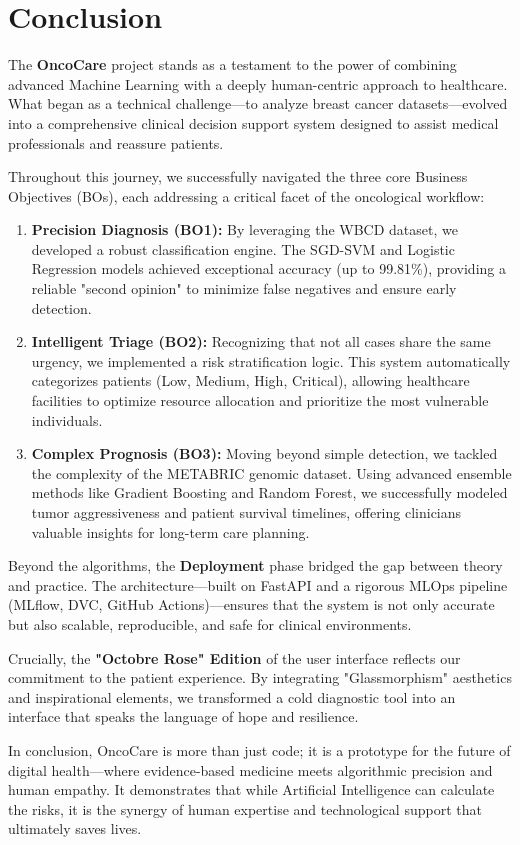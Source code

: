 \chapter{Conclusion}

The \textbf{OncoCare} project stands as a testament to the power of combining advanced Machine Learning with a deeply human-centric approach to healthcare. What began as a technical challenge—to analyze breast cancer datasets—evolved into a comprehensive clinical decision support system designed to assist medical professionals and reassure patients.

Throughout this journey, we successfully navigated the three core Business Objectives (BOs), each addressing a critical facet of the oncological workflow:

\begin{enumerate}
    \item \textbf{Precision Diagnosis (BO1):} By leveraging the WBCD dataset, we developed a robust classification engine. The SGD-SVM and Logistic Regression models achieved exceptional accuracy (up to 99.81\%), providing a reliable "second opinion" to minimize false negatives and ensure early detection.
    
    \item \textbf{Intelligent Triage (BO2):} Recognizing that not all cases share the same urgency, we implemented a risk stratification logic. This system automatically categorizes patients (Low, Medium, High, Critical), allowing healthcare facilities to optimize resource allocation and prioritize the most vulnerable individuals.
    
    \item \textbf{Complex Prognosis (BO3):} Moving beyond simple detection, we tackled the complexity of the METABRIC genomic dataset. Using advanced ensemble methods like Gradient Boosting and Random Forest, we successfully modeled tumor aggressiveness and patient survival timelines, offering clinicians valuable insights for long-term care planning.
\end{enumerate}

Beyond the algorithms, the \textbf{Deployment} phase bridged the gap between theory and practice. The architecture—built on FastAPI and a rigorous MLOps pipeline (MLflow, DVC, GitHub Actions)—ensures that the system is not only accurate but also scalable, reproducible, and safe for clinical environments.

Crucially, the \textbf{"Octobre Rose" Edition} of the user interface reflects our commitment to the patient experience. By integrating "Glassmorphism" aesthetics and inspirational elements, we transformed a cold diagnostic tool into an interface that speaks the language of hope and resilience.

In conclusion, OncoCare is more than just code; it is a prototype for the future of digital health—where evidence-based medicine meets algorithmic precision and human empathy. It demonstrates that while Artificial Intelligence can calculate the risks, it is the synergy of human expertise and technological support that ultimately saves lives.
